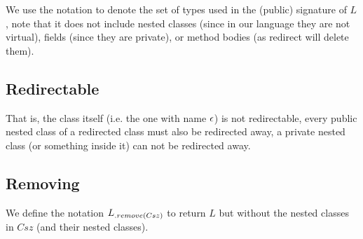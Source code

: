 We use the notation  to denote the set of types used in the (public) signature of $L$, note that it does not include nested classes (since in our language they are not virtual),  fields (since they are private), or method bodies (as redirect will delete them).

\subsection{Redirectable}
\begin{defs}
\end{defs}
That is, the class itself (i.e. the one with name $\epsilon$) is not redirectable, every public nested class of a redirected class must also be redirected away, a private nested class (or something inside it) can not be redirected away.


\subsection{Removing}

We define the notation $L{{}_{.{remove}({Csz})}}$ to return $L$ but without the nested classes in $Csz$ (and their nested classes).

\begin{defs}
	
\end{defs}

